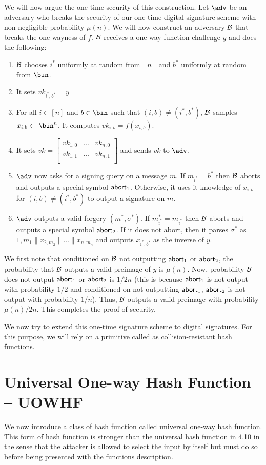 We will now argue the one-time security of this construction. Let $\adv$ be an adversary who breaks the security of our one-time digital signature scheme with non-negligible probability $\mu(n)$. We will now construct an adversary $\mathcal{B}$ that breaks the one-wayness of $f$. $\mathcal{B}$ receives a one-way function challenge $y$ and does the following:
\begin{enumerate}
    \item $\mathcal{B}$ chooses $i^*$ uniformly at random from $[n]$ and $b^*$ uniformly at random from $\bin$.
    \item It sets $vk_{i^*,b^*} = y$
    \item For all $i \in [n]$ and $b \in \bin$ such that $(i,b) \neq (i^*,b^*)$, $\mathcal{B}$ samples $x_{i,b} \gets \bin^n$. It computes $vk_{i,b} = f(x_{i,b})$.
    \item It sets $vk = \left[ \begin{array}{ccc}
vk_{1,0} & \ldots& vk_{n,0} \\
vk_{1,1} & \ldots& vk_{n,1} \\
\end{array} \right]$ and sends $vk$ to $\adv$.
\item $\adv$ now asks for a signing query on a message $m$. If $m_{i^*} = b^*$ then $\mathcal{B}$ aborts and outputs a special symbol $\mathsf{abort}_1$. Otherwise, it uses it knowledge of $x_{i,b}$ for $(i,b) \neq (i^*,b^*)$ to output a signature on $m$.
\item $\adv$ outputs a valid forgery $(m^*,\sigma^*)$. If $m^*_{i^*} = m_{i^*}$ then $\mathcal{B}$ aborts and outputs a special symbol $\mathsf{abort}_2$. If it does not abort, then it parses $\sigma^*$ as ${1,m_1}\|x_{2,m_2}\| \ldots \| x_{n,m_n}$ and outputs $x_{i^*,b^*}$ as the inverse of $y$.
\end{enumerate}
We first note that conditioned on $\mathcal{B}$ not outputting $\mathsf{abort}_1$ or $\mathsf{abort}_2$, the probability that $\mathcal{B}$ outputs a valid preimage of $y$ is $\mu(n)$. Now, probability $\mathcal{B}$ does not output $\mathsf{abort}_1$ or $\mathsf{abort}_2$ is $1/2n$ (this is because $\mathsf{abort}_1$ is not output with probability $1/2$ and conditioned on not outputting $\mathsf{abort}_1$, $\mathsf{abort}_2$ is not output with probability $1/n$). Thus, $\mathcal{B}$ outputs a valid preimage with probability $\mu(n)/2n$. This completes the proof of security.

We now try to extend this one-time signature scheme to digital signatures. For this purpose, we will rely on a primitive called as collision-resistant hash functions.

\section{Universal One-way Hash Function -- UOWHF}
We now introduce a class of hash function called universal one-way hash function. 
This form of hash function is stronger than the universal hash function in 4.10 in the sense that the attacker is allowed to select the input by itself but must do so before being presented with the functions description. 

